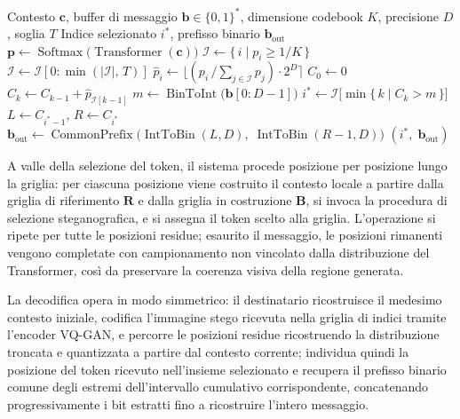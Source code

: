 \begin{algorithm}[tbhp]
	\caption{Selezione steganografica del token visivo}
	\label{alg:selezione-token}
	\begin{algorithmic}[1]
		\Require Contesto $\mathbf{c}$, buffer di messaggio $\mathbf{b} \in \{0,1\}^*$, dimensione codebook $K$, precisione $D$, soglia $T$
		\Ensure Indice selezionato $i^*$, prefisso binario $\mathbf{b}_{\text{out}}$
		\State $\mathbf{p} \leftarrow \operatorname{Softmax}\bigl(\operatorname{Transformer}(\mathbf{c})\bigr)$
		\State $\mathcal{I} \leftarrow \{\,i \mid p_i \ge 1/K\,\}$ 
		\State $\mathcal{I} \leftarrow \mathcal{I}[0:\min(|\mathcal{I}|,\, T)]$ 
		\State $\hat{p}_i \leftarrow \bigl\lfloor (p_i \,/ \sum_{j \in \mathcal{I}} p_j) \cdot 2^D \bigr\rceil$ 
		\EndFor
		\State $C_0 \leftarrow 0$
		\State $C_k \leftarrow C_{k-1} + \hat{p}_{\mathcal{I}[k-1]}$ 
		\EndFor
		\State $m \leftarrow \operatorname{BinToInt}\bigl(\mathbf{b}[0:D-1]\bigr)$ 
		\State $i^* \leftarrow \mathcal{I}\bigl[\min\{\,k \mid C_k > m\,\}\bigr]$
		\State $L \leftarrow C_{i^*-1}$,\; $R \leftarrow C_{i^*}$
		\State $\mathbf{b}_{\text{out}} \leftarrow \operatorname{CommonPrefix}\bigl(\operatorname{IntToBin}(L, D),\; \operatorname{IntToBin}(R-1, D)\bigr)$
		\State \Return $(i^*,\; \mathbf{b}_{\text{out}})$
	\end{algorithmic}
\end{algorithm}

A valle della selezione del token, il sistema procede posizione per posizione lungo la griglia: per ciascuna posizione viene costruito il contesto locale a partire dalla griglia di riferimento $\mathbf{R}$ e dalla griglia in costruzione $\mathbf{B}$, si invoca la procedura di selezione steganografica, e si assegna il token scelto alla griglia. L'operazione si ripete per tutte le posizioni residue; esaurito il messaggio, le posizioni rimanenti vengono completate con campionamento non vincolato dalla distribuzione del Transformer, così da preservare la coerenza visiva della regione generata.

La decodifica opera in modo simmetrico: il destinatario ricostruisce il medesimo contesto iniziale, codifica l'immagine stego ricevuta nella griglia di indici tramite l'encoder VQ-GAN, e percorre le posizioni residue ricostruendo la distribuzione troncata e quantizzata a partire dal contesto corrente; individua quindi la posizione del token ricevuto nell'insieme selezionato e recupera il prefisso binario comune degli estremi dell'intervallo cumulativo corrispondente, concatenando progressivamente i bit estratti fino a ricostruire l'intero messaggio.

